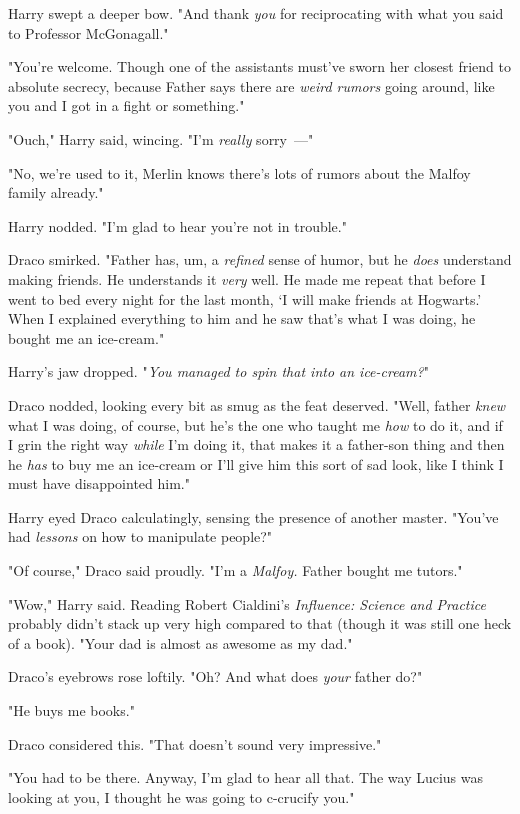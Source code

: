 Harry swept a deeper bow. "And thank \emph{you} for reciprocating with what you
said to Professor McGonagall."

"You're welcome. Though one of the assistants must've sworn her closest friend
to absolute secrecy, because Father says there are \emph{weird rumors} going
around, like you and I got in a fight or something."

"Ouch," Harry said, wincing. "I'm \emph{really} sorry~---"

"No, we're used to it, Merlin knows there's lots of rumors about the Malfoy
family already."

Harry nodded. "I'm glad to hear you're not in trouble."

Draco smirked. "Father has, um, a \emph{refined} sense of humor, but he
\emph{does} understand making friends. He understands it \emph{very} well. He
made me repeat that before I went to bed every night for the last month, `I
will make friends at Hogwarts.' When I explained everything to him and he saw
that's what I was doing, he bought me an ice-cream."

Harry's jaw dropped. "\emph{You managed to spin that into an ice-cream?}"

Draco nodded, looking every bit as smug as the feat deserved. "Well, father
\emph{knew} what I was doing, of course, but he's the one who taught me
\emph{how} to do it, and if I grin the right way \emph{while} I'm doing it,
that makes it a father-son thing and then he \emph{has} to buy me an ice-cream
or I'll give him this sort of sad look, like I think I must have disappointed
him."

Harry eyed Draco calculatingly, sensing the presence of another master. "You've
had \emph{lessons} on how to manipulate people?"

"Of course," Draco said proudly. "I'm a \emph{Malfoy.} Father bought me tutors."

"Wow," Harry said. Reading Robert Cialdini's \emph{Influence: Science and
Practice} probably didn't stack up very high compared to that (though it was
still one heck of a book). "Your dad is almost as awesome as my dad."

Draco's eyebrows rose loftily. "Oh? And what does \emph{your} father do?"

"He buys me books."

Draco considered this. "That doesn't sound very impressive."

"You had to be there. Anyway, I'm glad to hear all that. The way Lucius was
looking at you, I thought he was going to c-crucify you."

